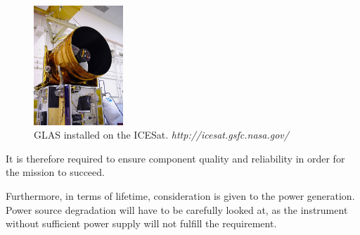 \begin{figure}
	\begin{center}
  \includegraphics[width=0.3\textwidth]{chapters/img/glas.jpg}
  \end{center}
  \caption{\ac{GLAS} installed on the ICESat. \emph{http://icesat.gsfc.nasa.gov/}}
  \label{fig:glas}
\end{figure}

It is therefore required to ensure component quality and reliability in order for the mission to succeed.

Furthermore, in terms of lifetime, consideration is given to the power generation. Power source degradation will have to be carefully looked at, as the instrument without sufficient power supply will not fulfill the requirement.


